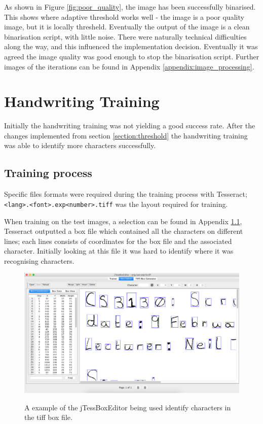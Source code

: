 As shown in Figure \ref{fig:poor_quality}, the image has been successfully binarised. This shows where adaptive threshold works well - the image is a poor quality image, but it is locally thresheld. Eventually the output of the image is a clean binarisation script, with little noise. There were naturally technical difficulties along the way, and this influenced the implementation decision. Eventually it was agreed the image quality was good enough to stop the binarisation script. Further images of the iterations can be found in Appendix \ref{appendix:image_processing}.

\section{Handwriting Training}
Initially the handwriting training was not yielding a good success rate. After the changes implemented from section \ref{section:threshold} the handwriting training was able to identify more characters successfully.

\subsection{Training process}
Specific files formats were required during the training process with Tesseract; \texttt{<lang>.<font>.exp<number>.tiff} was the layout required for training.

When training on the test images, a selection can be found in Appendix \ref{}, Tesseract outputted a box file which contained all the characters on different lines; each lines consists of coordinates for the box file and the associated character. Initially looking at this file it was hard to identify where it was recognising characters.

\begin{figure}[H]
  \centering
  \includegraphics[width=\textwidth]{images/box_editor}
  \label{fig:box_editor}
  \caption{A example of the jTessBoxEditor being used identify characters in the tiff box file.}
\end{figure}

